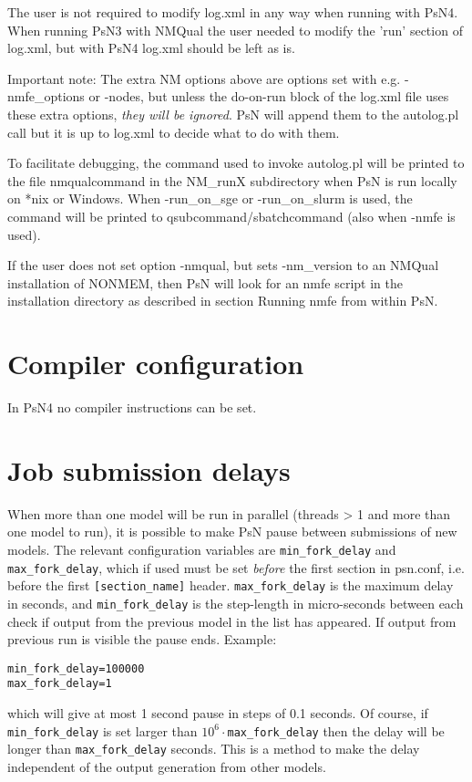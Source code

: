 The user is not required to modify log.xml in any way when running with PsN4.
When running PsN3 with NMQual the user needed to modify the 'run' section of log.xml, but with PsN4 
log.xml should be left as is.

Important note: The extra NM options above are options set with e.g. -nmfe\_options or -nodes, but unless the
do-on-run block of the log.xml file uses these extra options, 
\emph{they will be ignored}. 
PsN will append them to the autolog.pl call but it is up to log.xml to decide what to do with them.

To facilitate debugging, the command 
used to invoke autolog.pl will be printed to the file 
nmqualcommand in the NM\_runX subdirectory
when PsN is run locally on *nix or Windows. 
When -run\_on\_sge or -run\_on\_slurm is used, the command
will be printed to qsubcommand/sbatchcommand (also when -nmfe is used). 

If the user does not set option -nmqual, but sets -nm\_version to an NMQual installation of NONMEM, then PsN will look for an nmfe script in the installation directory
as described in section Running nmfe from within PsN.

\section{Compiler configuration}

In PsN4 no compiler instructions can be set.

\section{Job submission delays}
When more than one model will be run in parallel (threads > 1 and more than one model to run), it is possible to
make PsN pause between submissions of new models. The relevant configuration variables are
\verb|min_fork_delay| and \verb|max_fork_delay|, which if used must be set \emph{before} the first section
in psn.conf, i.e. before the first \verb|[section_name]| header.
\verb|max_fork_delay| is the maximum delay in seconds, and \verb|min_fork_delay| is
the step-length in micro-seconds between each check if output from the previous model in the list has appeared. If
output from previous run is visible the pause ends.
Example:
\begin{verbatim}
min_fork_delay=100000
max_fork_delay=1
\end{verbatim}
which will give at most 1 second pause in steps of 0.1 seconds.
Of course, if \verb|min_fork_delay| is set larger than
$10^6\cdot$\verb|max_fork_delay| then the delay will be longer than
\verb|max_fork_delay| seconds. This is a method to make
the delay independent of the output generation from other models.

